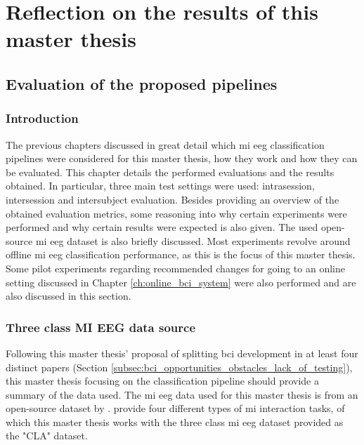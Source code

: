 \part{Reflection on the results of this master thesis}
\label{part:reflection}

\chapter{Evaluation of the proposed pipelines}
\label{ch:evaluation}

\section{Introduction}
\label{sec:evaluation_introduction}

The previous chapters discussed in great detail which \gls{mi} \gls{eeg} classification pipelines were considered for this master thesis, how they work and how they can be evaluated.
This chapter details the performed evaluations and the results obtained.
In particular, three main test settings were used: intrasession, intersession and intersubject evaluation.
Besides providing an overview of the obtained evaluation metrics, some reasoning into why certain experiments were performed and why certain results were expected is also given.
The used open-source \gls{mi} \gls{eeg} dataset is also briefly discussed.
Most experiments revolve around offline \gls{mi} \gls{eeg} classification performance, as this is the focus of this master thesis.
Some pilot experiments regarding recommended changes for going to an online setting discussed in Chapter \ref{ch:online_bci_system} were also performed and are also discussed in this section.

\section{Three class MI EEG data source}
\label{sec:evaluation_data_source}

Following this master thesis' proposal of splitting \gls{bci} development in at least four distinct papers (Section \ref{subsec:bci_opportunities_obstacles_lack_of_testing}), this master thesis focusing on the classification pipeline should provide a summary of the data used.
The \gls{mi} \gls{eeg} data used for this master thesis is from an open-source dataset by \citet{eeg_data}.
 provide four different types of \gls{mi} interaction tasks, of which this master thesis works with the three class \gls{mi} \gls{eeg} dataset provided as the "CLA" dataset.

